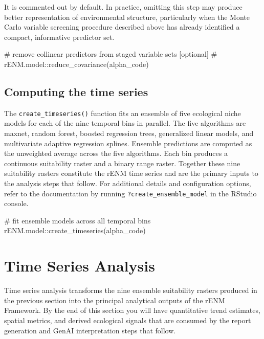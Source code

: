 \documentclass[
  letterpaper,
  DIV=11,
  numbers=noendperiod]{scrartcl}
\newenvironment{Shaded}{\begin{snugshade}}{\end{snugshade}}
\newcommand{\CommentTok}[1]{\textcolor[rgb]{0.37,0.37,0.37}{#1}}
\newcommand{\FunctionTok}[1]{\textcolor[rgb]{0.28,0.35,0.67}{#1}}
\newcommand{\NormalTok}[1]{\textcolor[rgb]{0.00,0.23,0.31}{#1}}
\newcommand{\SpecialCharTok}[1]{\textcolor[rgb]{0.37,0.37,0.37}{#1}}
\begin{document}
It is commented out by default. In practice, omitting this step may
produce better representation of environmental structure, particularly
when the Monte Carlo variable screening procedure described above has
already identified a compact, informative predictor set.

\begin{Shaded}
\begin{Highlighting}[]
\CommentTok{\# remove collinear predictors from staged variable sets [optional]}
\CommentTok{\# rENM.model::reduce\_covariance(alpha\_code)}
\end{Highlighting}
\end{Shaded}

\subsection{Computing the time series}\label{computing-the-time-series}

The \texttt{create\_timeseries()} function fits an ensemble of five
ecological niche models for each of the nine temporal bins in parallel.
The five algorithms are maxnet, random forest, boosted regression trees,
generalized linear models, and multivariate adaptive regression splines.
Ensemble predictions are computed as the unweighted average across the
five algorithms. Each bin produces a continuous suitability raster and a
binary range raster. Together these nine suitability rasters constitute
the rENM time series and are the primary inputs to the analysis steps
that follow. For additional details and configuration options, refer to
the documentation by running \texttt{?create\_ensemble\_model} in the
RStudio console.

\begin{Shaded}
\begin{Highlighting}[]
\CommentTok{\# fit ensemble models across all temporal bins}
\NormalTok{rENM.model}\SpecialCharTok{::}\FunctionTok{create\_timeseries}\NormalTok{(alpha\_code)}
\end{Highlighting}
\end{Shaded}

\section{Time Series Analysis}\label{time-series-analysis}

Time series analysis transforms the nine ensemble suitability rasters
produced in the previous section into the principal analytical outputs
of the rENM Framework. By the end of this section you will have
quantitative trend estimates, spatial metrics, and derived ecological
signals that are consumed by the report generation and GenAI
interpretation steps that follow.
\end{document}
